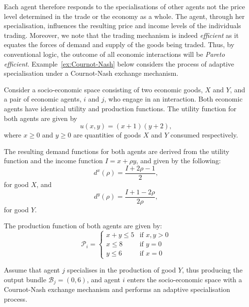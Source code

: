 Each agent therefore responds to the specialisations of other agents not the price level determined in the trade or the economy as a whole. The agent, through her specialisation, influences the resulting price and income levels of the individuals trading. Moreover, we note that the trading mechanism is indeed \emph{efficient} as it equates the forces of demand and supply of the goods being traded. Thus, by conventional logic, the outcome of all economic interactions will be \emph{Pareto efficient}. Example~\ref{ex:Cournot-Nash} below considers the process of adaptive specialisation under a Cournot-Nash exchange mechanism.

\begin{example} \label{ex:Cournot-Nash}
Consider a socio-economic space consisting of two economic goods, $X$ and $Y$, and a pair of economic agents, $i$ and $j$, who engage in an interaction. Both economic agents have identical utility and production functions. The utility function for both agents are given by
\begin{equation}
    u(x,y) = (x + 1) (y + 2) ,
\end{equation}
where $x \geqslant 0$ and $y \geqslant 0$ are quantities of goods $X$ and $Y$ consumed respectively.

The resulting demand functions for both agents are derived from the utility function and the income function $I = x + \rho y$, and given by the following:
\begin{equation}
d^{x}(\rho) = \frac{I + 2 \rho - 1}{2} ,
\end{equation}
for good $X$, and
\begin{equation}
d^{y}(\rho) = \frac{I + 1 - 2 \rho }{2 \rho} ,
\end{equation}
for good $Y$.

The production function of both agents are given by:
\[ \mathcal{P}_{i} = \left\{ \begin{array}{ll}
         x + y \leqslant 5 & \mbox{if $x,y > 0$}\\
		 x \leqslant 8 & \mbox{if $y = 0$}\\
         y \leqslant 6 & \mbox{if $x = 0$}\end{array} \right. \]

Assume that agent $j$ specialises in the production of good $Y$, thus producing the output bundle $\mathcal{B}_{j} = (0,6)$, and agent $i$ enters the socio-economic space with a Cournot-Nash exchange mechanism and performs an adaptive specialisation process.


\end{example}
